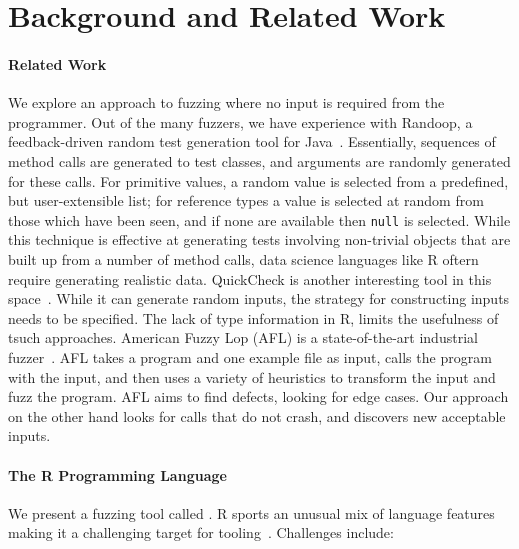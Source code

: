 \documentclass[sigplan,nonacm,anonymous,review]{acmart}
\begin{document}
\section{Background and Related Work}
\label{sec:background}

\paragraph{Related Work}
We explore an approach to fuzzing where no input is required from the
programmer.  Out of the many fuzzers, we have experience with Randoop,
a feedback-driven random test generation tool for
Java~\cite{pacheco2007randoop}.  Essentially, sequences of method
calls are generated to test classes, and arguments are randomly
generated for these calls. For primitive values, a random value is
selected from a predefined, but user-extensible list; for reference
types a value is selected at random from those which have been seen,
and if none are available then {\tt null} is selected.  While this
technique is effective at generating tests involving non-trivial
objects that are built up from a number of method calls, data science
languages like R oftern require generating realistic data.  QuickCheck
is another interesting tool in this space~\cite{quickcheck}.  While it
can generate random inputs, the strategy for constructing inputs needs
to be specified.  The lack of type information in R, limits the
usefulness of tsuch approaches. American Fuzzy Lop (AFL) is a
state-of-the-art industrial fuzzer~\cite{afl}. AFL takes a program and
one example file as input, calls the program with the input, and then
uses a variety of heuristics to transform the input and fuzz the
program.  AFL aims to find defects, looking for edge cases.  Our
approach on the other hand looks for calls that do not crash, and
discovers new acceptable inputs.

\paragraph{The R Programming Language}

We present a fuzzing tool called \tool.  R sports an unusual mix of
language features making it a challenging target for
tooling~\cite{morandat2012evaluating}.  Challenges include:
\end{document}
